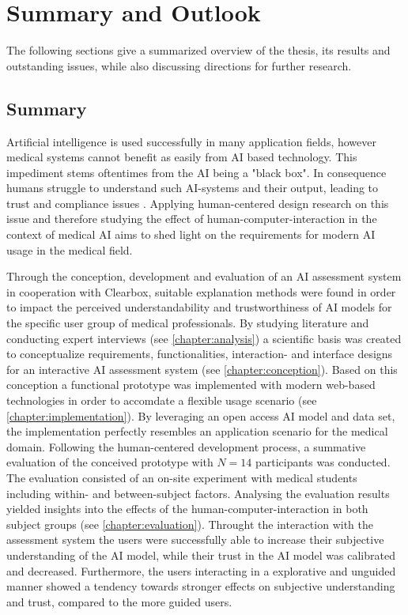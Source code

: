 \documentclass[11pt,a4paper,english]{scrreprt}
\begin{document}
\newpage
\chapter{Summary and Outlook}
The following sections give a summarized overview of the thesis, its results and outstanding issues, while also discussing directions for further research.

\section{Summary}
Artificial intelligence is used successfully in many application fields, however medical systems cannot benefit as easily from AI based technology. This impediment stems oftentimes from the AI being a "black box". In consequence humans struggle to understand such AI-systems and their output, leading to trust and compliance issues \parencite{eu_com_ai,adadi_blackbox_2018}. Applying human-centered design research on this issue and therefore studying the effect of human-computer-interaction in the context of medical AI aims to shed light on the requirements for modern AI usage in the medical field.

Through the conception, development and evaluation of an AI assessment system in cooperation with Clearbox, suitable explanation methods were found in order to impact the perceived understandability and trustworthiness of AI models for the specific user group of medical professionals. By studying literature and conducting expert interviews (see \autoref{chapter:analysis}) a scientific basis was created to conceptualize requirements, functionalities, interaction- and interface designs for an interactive AI assessment system (see \autoref{chapter:conception}). Based on this conception a functional prototype was implemented with modern web-based technologies in order to accomdate a flexible usage scenario (see \autoref{chapter:implementation}). By leveraging an open access AI model and data set, the implementation perfectly resembles an application scenario for the medical domain. Following the human-centered development process, a summative evaluation of the conceived prototype with $\textit{N}=14$ participants was conducted. The evaluation consisted of an on-site experiment with medical students including within- and between-subject factors. Analysing the evaluation results yielded insights into the effects of the human-computer-interaction in both subject groups (see \autoref{chapter:evaluation}). Throught the interaction with the assessment system the users were successfully able to increase their subjective understanding of the AI model, while their trust in the AI model was calibrated and decreased. Furthermore, the users interacting in a explorative and unguided manner showed a tendency towards stronger effects on subjective understanding and trust, compared to the more guided users.
\end{document}
